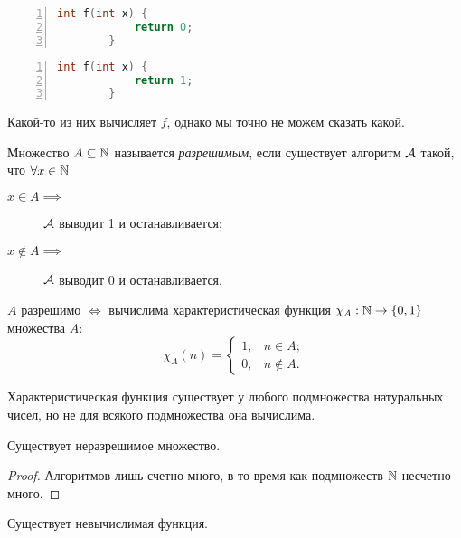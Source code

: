 \noindent\begin{minipage}[t]{0.45\textwidth}
    \begin{lstlisting}[frame=single, language=C++, numbers=left]
        int f(int x) {
            return 0;
        }
    \end{lstlisting}
\end{minipage}
\noindent\hfill\begin{minipage}[t]{0.45\textwidth}
    \begin{lstlisting}[frame=single, language=C++, numbers=left]
        int f(int x) {
            return 1;
        }
    \end{lstlisting}
\end{minipage}

Какой-то из них вычисляет $f$, однако мы точно не можем сказать какой.

\begin{definition}
    Множество $A \subseteq \N$ называется {\it разрешимым}, если существует алгоритм $\AA$ такой, что $\forall x \in \N$
    \begin{description}
        \item[$x \in A \implies$] $\AA$ выводит 1 и останавливается;
        \item[$x \notin A \implies$] $\AA$ выводит 0 и останавливается.
    \end{description}
\end{definition}

\begin{statement}
    $A$ разрешимо $\iff$ вычислима характеристическая функция $\chi_{A}: \N \to \left\{0, 1\right\}$ множества $A$:
    $$
        \chi_{A}\left(n\right) = \begin{cases}
            1, & n \in A; \\
            0, & n \notin A.
        \end{cases}
    $$
\end{statement}

Характеристическая функция существует у любого подмножества натуральных чисел, но не для всякого подмножества она вычислима.

\begin{statement}
    Существует неразрешимое множество.
\end{statement}
\begin{proof}
    Алгоритмов лишь счетно много, в то время как подмножеств $\N$ несчетно много.
\end{proof}

\begin{corollary}
    Существует невычислимая функция.
\end{corollary}


